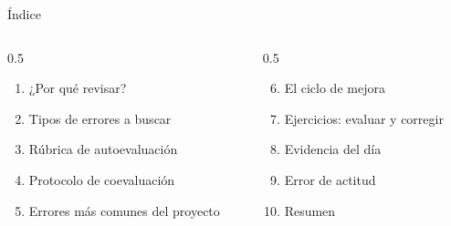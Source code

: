 \documentclass[aspectratio=169, 10pt, spanish]{beamer}
\begin{document}
\begin{frame}[plain]\titlepage\end{frame}

\begin{frame}{Índice}
  \begin{columns}[t]
    \begin{column}{0.5\textwidth}
      \begin{enumerate}
        \item ¿Por qué revisar?
        \item Tipos de errores a buscar
        \item Rúbrica de autoevaluación
        \item Protocolo de coevaluación
        \item Errores más comunes del proyecto
      \end{enumerate}
    \end{column}
    \begin{column}{0.5\textwidth}
      \begin{enumerate}\setcounter{enumi}{5}
        \item El ciclo de mejora
        \item Ejercicios: evaluar y corregir
        \item Evidencia del día
        \item Error de actitud
        \item Resumen
      \end{enumerate}
    \end{column}
  \end{columns}
\end{frame}

\end{document}
